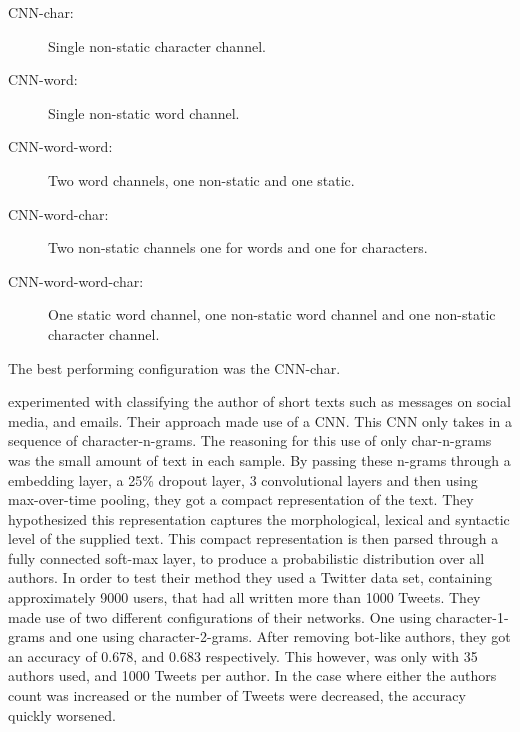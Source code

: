 \begin{description}
    \item[CNN-char:] Single non-static character channel.
    \item[CNN-word:] Single non-static word channel.
    \item[CNN-word-word:] Two word channels, one non-static and one static.
    \item[CNN-word-char:] Two non-static channels one for words and one for
        characters.
    \item[CNN-word-word-char:] One static word channel, one non-static word
        channel and one non-static character channel.
\end{description}

\noindent
The best performing configuration was the CNN-char.

\citet{shrestha2017} experimented with classifying the author of short texts
such as messages on social media, and emails. Their approach made use of a
\gls{CNN}. This \gls{CNN} only takes in a sequence of character-n-grams. The
reasoning for this use of only char-n-grams was the small amount of text in
each sample. By passing these n-grams through a embedding layer, a 25\% dropout
layer, 3 convolutional layers and then using max-over-time pooling, they got
a compact representation of the text. They hypothesized this representation
captures the morphological, lexical and syntactic level of the supplied text.
This compact representation is then parsed through a fully connected soft-max
layer, to produce a probabilistic distribution over all authors. In order
to test their method they used a Twitter data set, containing approximately
9000 users, that had all written more than 1000 Tweets. They made use of two
different configurations of their networks. One using character-1-grams and one
using character-2-grams. After removing bot-like authors, they got an accuracy
of 0.678, and 0.683 respectively. This however, was only with 35 authors used,
and 1000 Tweets per author. In the case where either the authors count was
increased or the number of Tweets were decreased, the accuracy quickly worsened.

